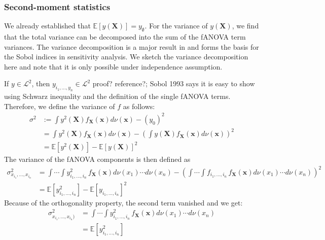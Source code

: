\subsubsection*{Second-moment statistics}
We already established that $\mathbb{E}[y(\boldsymbol{X})] = y_{\emptyset}$.
For the variance of $y(\boldsymbol{X})$, we find that the total variance can be decomposed into the sum of the fANOVA term variances. The variance decomposition is a major result in \cite{sobol1993sensitivity} and forms the basis for the Sobol indices in sensitivity analysis. We sketch the variance decomposition here and note that it is only possible under independence assumption.\par
If $y \in \mathcal{L}^2$, then $y_{i_{1}, \dots, y_{n}} \in \mathcal{L}^2$ {\color{blue}proof? reference?; Sobol 1993 says it is easy to show using Schwarz inequality and the definition of the single fANOVA terms.}
Therefore, we define the variance of $f$ as follows:
\begin{align*}
    \sigma^2 &:= \int y^2(\boldsymbol{X}) f_{\boldsymbol{X}}(\boldsymbol{x}) d\nu (\boldsymbol{x}) - (y_0)^2 \\
    &= \int y^2(\boldsymbol{X}) f_{\boldsymbol{X}}(\boldsymbol{x}) d\nu (\boldsymbol{x}) - (\int y(\boldsymbol{X}) f_{\boldsymbol{X}}(\boldsymbol{x}) d\nu (\boldsymbol{x}))^2 \\
    &= \mathbb{E}[y^2(\boldsymbol{X})] - \mathbb{E}[y(\boldsymbol{X})]^2
    \label{variance_whole}
\end{align*}
The variance of the fANOVA components is then defined as
\begin{align*}
    \sigma^2_{x_{i_1}, \dots, x_{i_n}}
    &= \int \cdots \int y^2_{i_{1}, \dots, i_{n}} \, f_{\boldsymbol{X}}(\boldsymbol{x}) d\nu(x_1) \cdots d\nu(x_n) - \left( \int \cdots \int f_{i_{1}, \dots, i_{n}} \, f_{\boldsymbol{X}}(\boldsymbol{x}) d\nu(x_1) \cdots d\nu(x_n) \right)^2\\
    &= \mathbb{E}[y^2_{i_{1}, \dots, i_{n}}] - \mathbb{E}[y_{i_{1}, \dots, i_{n}}]^2
\end{align*}
Because of the orthogonality property, the second term vanished and we get:
\begin{align*}
    \sigma^2_{x_{i_1}, \dots, x_{i_n})}
    &= \int \cdots \int y^2_{i_{1}, \dots, i_{n}} \, f_{\boldsymbol{X}}(\boldsymbol{x}) d\nu(x_1) \cdots d\nu(x_n)\\
    &= \mathbb{E}[y^2_{i_{1}, \dots, i_{n}}]
\end{align*}

